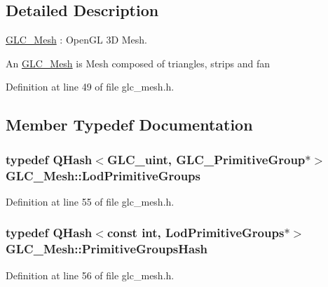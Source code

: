 \subsection{Detailed Description}
\hyperlink{class_g_l_c___mesh}{G\-L\-C\-\_\-\-Mesh} \-: Open\-G\-L 3\-D Mesh. 

An \hyperlink{class_g_l_c___mesh}{G\-L\-C\-\_\-\-Mesh} is Mesh composed of triangles, strips and fan 

Definition at line 49 of file glc\-\_\-mesh.\-h.



\subsection{Member Typedef Documentation}
\hypertarget{class_g_l_c___mesh_a0a11b2f6d1bc53db43730a7427f3f0d5}{
\subsubsection[{Lod\-Primitive\-Groups}]{\setlength{\rightskip}{0pt plus 5cm}typedef Q\-Hash$<${\bf G\-L\-C\-\_\-uint}, {\bf G\-L\-C\-\_\-\-Primitive\-Group}$\ast$$>$ {\bf G\-L\-C\-\_\-\-Mesh\-::\-Lod\-Primitive\-Groups}}}\label{class_g_l_c___mesh_a0a11b2f6d1bc53db43730a7427f3f0d5}


Definition at line 55 of file glc\-\_\-mesh.\-h.

\hypertarget{class_g_l_c___mesh_ac9d1c131c1c6044dbc79112dcaa1dfeb}{
\subsubsection[{Primitive\-Groups\-Hash}]{\setlength{\rightskip}{0pt plus 5cm}typedef Q\-Hash$<$const {\bf int}, {\bf Lod\-Primitive\-Groups}$\ast$$>$ {\bf G\-L\-C\-\_\-\-Mesh\-::\-Primitive\-Groups\-Hash}}}\label{class_g_l_c___mesh_ac9d1c131c1c6044dbc79112dcaa1dfeb}


Definition at line 56 of file glc\-\_\-mesh.\-h.



